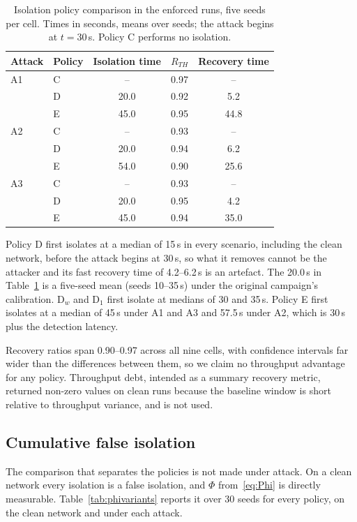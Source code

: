\begin{table}[!t]
\caption{Isolation policy comparison in the enforced runs, five seeds per cell.
Times in seconds, means over seeds; the attack begins at $t = 30$\,s. Policy C performs no
isolation.}
\label{tab:policy}
\centering
\footnotesize
\begin{tabular}{@{}llccc@{}}
\toprule
Attack & Policy & Isolation time & $R_{TH}$ & Recovery time \\
\midrule
A1 & C & -- & 0.97 & -- \\
   & D & 20.0 & 0.92 & 5.2 \\
   & E & 45.0 & 0.95 & 44.8 \\
A2 & C & -- & 0.93 & -- \\
   & D & 20.0 & 0.94 & 6.2 \\
   & E & 54.0 & 0.90 & 25.6 \\
A3 & C & -- & 0.93 & -- \\
   & D & 20.0 & 0.95 & 4.2 \\
   & E & 45.0 & 0.94 & 35.0 \\
\bottomrule
\end{tabular}
\end{table}

Policy D first isolates at a median of 15\,s in every scenario, including the
clean network, before the attack begins at 30\,s, so what it removes cannot be
the attacker and its fast recovery time of 4.2--6.2\,s is an artefact. The
20.0\,s in Table~\ref{tab:policy} is a five-seed mean (seeds 10--35\,s) under
the original campaign's calibration. D$_w$ and D$_1$ first isolate at medians
of 30 and 35\,s. Policy E first isolates at a median of 45\,s under A1 and A3
and 57.5\,s under A2, which is 30\,s plus the detection latency.

Recovery ratios span 0.90--0.97 across all nine cells, with confidence
intervals far wider than the differences between them, so we claim no
throughput advantage for any policy. Throughput debt, intended as a summary
recovery metric, returned non-zero values on clean runs because the baseline
window is short relative to throughput variance, and is not used.

\subsection{Cumulative false isolation}
\label{sec:phi}

The comparison that separates the policies is not made under attack. On a clean
network every isolation is a false isolation, and $\Phi$ from~\eqref{eq:Phi} is
directly measurable. Table~\ref{tab:phivariants} reports
it over 30 seeds for every policy, on the clean network and under each attack.

